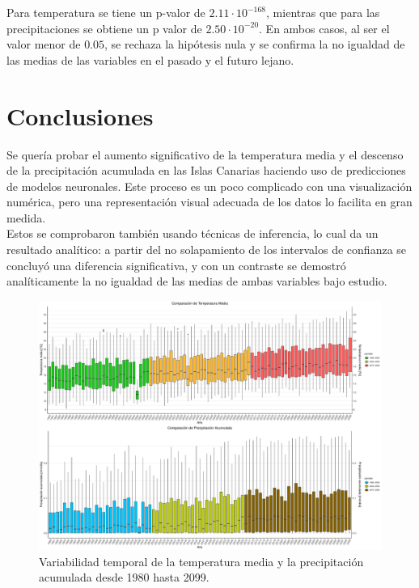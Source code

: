 \documentclass[9pt,twocolumn,twoside]{opticajnl}
\begin{document}
Para temperatura se tiene un p-valor de $2.11 \cdot 10^{-168}$, mientras que para las precipitaciones se obtiene un p valor de $2.50 \cdot 10^{-20}$. En ambos casos, al ser el valor menor de $0.05$, se rechaza la hipótesis nula y se confirma la no igualdad de las medias de las variables en el pasado y el futuro lejano.

\section{Conclusiones}

Se quería probar el aumento significativo de la temperatura media y el descenso de la precipitación acumulada en las Islas Canarias haciendo uso de predicciones de modelos neuronales. Este proceso es un poco complicado con una visualización numérica, pero una representación visual adecuada de los datos lo facilita en gran medida. \\

Estos se comprobaron también usando técnicas de inferencia, lo cual da un resultado analítico: a partir del no solapamiento de los intervalos de confianza se concluyó una diferencia significativa, y con un contraste se demostró analíticamente la no igualdad de las medias de ambas variables bajo estudio. 

\addtocounter{figure}{-3}
\begin{figure}
\centering
\includegraphics[height=0.7\textheight, angle=270]{fotos/combined_plot.pdf}
\caption{Variabilidad temporal de la temperatura media y la precipitación acumulada desde 1980 hasta 2099.}
\label{fig:2}
\end{figure}
\end{document}
